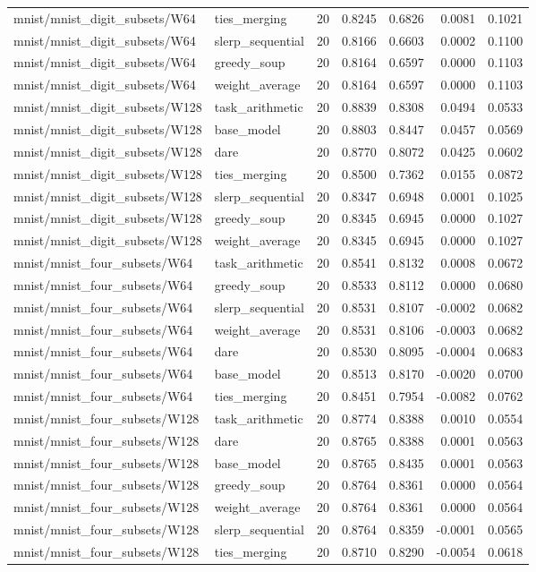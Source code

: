 \begin{tabular}{lllrrrr}
mnist/mnist\_digit\_subsets/W64 & ties\_merging & 20 & 0.8245 & 0.6826 & 0.0081 & 0.1021 \\
mnist/mnist\_digit\_subsets/W64 & slerp\_sequential & 20 & 0.8166 & 0.6603 & 0.0002 & 0.1100 \\
mnist/mnist\_digit\_subsets/W64 & greedy\_soup & 20 & 0.8164 & 0.6597 & 0.0000 & 0.1103 \\
mnist/mnist\_digit\_subsets/W64 & weight\_average & 20 & 0.8164 & 0.6597 & 0.0000 & 0.1103 \\
mnist/mnist\_digit\_subsets/W128 & task\_arithmetic & 20 & 0.8839 & 0.8308 & 0.0494 & 0.0533 \\
mnist/mnist\_digit\_subsets/W128 & base\_model & 20 & 0.8803 & 0.8447 & 0.0457 & 0.0569 \\
mnist/mnist\_digit\_subsets/W128 & dare & 20 & 0.8770 & 0.8072 & 0.0425 & 0.0602 \\
mnist/mnist\_digit\_subsets/W128 & ties\_merging & 20 & 0.8500 & 0.7362 & 0.0155 & 0.0872 \\
mnist/mnist\_digit\_subsets/W128 & slerp\_sequential & 20 & 0.8347 & 0.6948 & 0.0001 & 0.1025 \\
mnist/mnist\_digit\_subsets/W128 & greedy\_soup & 20 & 0.8345 & 0.6945 & 0.0000 & 0.1027 \\
mnist/mnist\_digit\_subsets/W128 & weight\_average & 20 & 0.8345 & 0.6945 & 0.0000 & 0.1027 \\
mnist/mnist\_four\_subsets/W64 & task\_arithmetic & 20 & 0.8541 & 0.8132 & 0.0008 & 0.0672 \\
mnist/mnist\_four\_subsets/W64 & greedy\_soup & 20 & 0.8533 & 0.8112 & 0.0000 & 0.0680 \\
mnist/mnist\_four\_subsets/W64 & slerp\_sequential & 20 & 0.8531 & 0.8107 & -0.0002 & 0.0682 \\
mnist/mnist\_four\_subsets/W64 & weight\_average & 20 & 0.8531 & 0.8106 & -0.0003 & 0.0682 \\
mnist/mnist\_four\_subsets/W64 & dare & 20 & 0.8530 & 0.8095 & -0.0004 & 0.0683 \\
mnist/mnist\_four\_subsets/W64 & base\_model & 20 & 0.8513 & 0.8170 & -0.0020 & 0.0700 \\
mnist/mnist\_four\_subsets/W64 & ties\_merging & 20 & 0.8451 & 0.7954 & -0.0082 & 0.0762 \\
mnist/mnist\_four\_subsets/W128 & task\_arithmetic & 20 & 0.8774 & 0.8388 & 0.0010 & 0.0554 \\
mnist/mnist\_four\_subsets/W128 & dare & 20 & 0.8765 & 0.8388 & 0.0001 & 0.0563 \\
mnist/mnist\_four\_subsets/W128 & base\_model & 20 & 0.8765 & 0.8435 & 0.0001 & 0.0563 \\
mnist/mnist\_four\_subsets/W128 & greedy\_soup & 20 & 0.8764 & 0.8361 & 0.0000 & 0.0564 \\
mnist/mnist\_four\_subsets/W128 & weight\_average & 20 & 0.8764 & 0.8361 & 0.0000 & 0.0564 \\
mnist/mnist\_four\_subsets/W128 & slerp\_sequential & 20 & 0.8764 & 0.8359 & -0.0001 & 0.0565 \\
mnist/mnist\_four\_subsets/W128 & ties\_merging & 20 & 0.8710 & 0.8290 & -0.0054 & 0.0618 \\
\bottomrule
\end{tabular}

